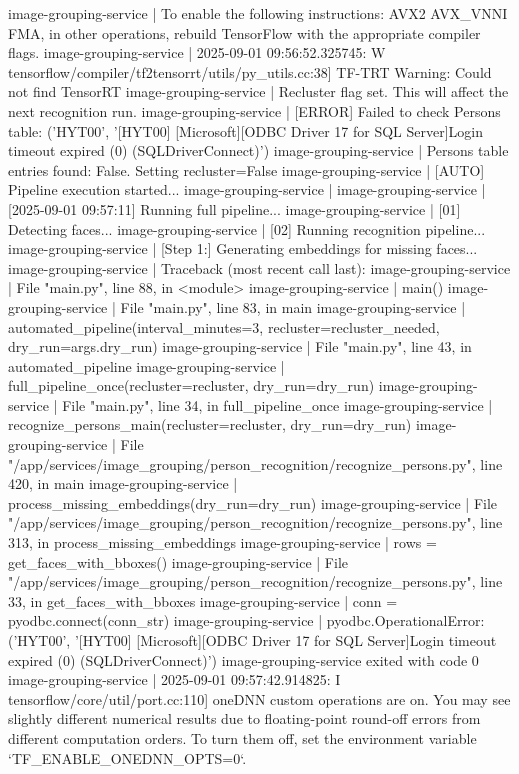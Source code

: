 image-grouping-service  | To enable the following instructions: AVX2 AVX_VNNI FMA, in other operations, rebuild TensorFlow with the appropriate compiler flags.
image-grouping-service  | 2025-09-01 09:56:52.325745: W tensorflow/compiler/tf2tensorrt/utils/py_utils.cc:38] TF-TRT Warning: Could not find TensorRT
image-grouping-service  | Recluster flag set. This will affect the next recognition run.
image-grouping-service  | [ERROR] Failed to check Persons table: ('HYT00', '[HYT00] [Microsoft][ODBC Driver 17 for SQL Server]Login timeout expired (0) (SQLDriverConnect)')
image-grouping-service  | Persons table entries found: False. Setting recluster=False
image-grouping-service  | [AUTO] Pipeline execution started...
image-grouping-service  |
image-grouping-service  | [2025-09-01 09:57:11] Running full pipeline...
image-grouping-service  | [01] Detecting faces...
image-grouping-service  | [02] Running recognition pipeline...
image-grouping-service  | [Step 1:] Generating embeddings for missing faces...
image-grouping-service  | Traceback (most recent call last):
image-grouping-service  |   File "main.py", line 88, in <module>
image-grouping-service  |     main()
image-grouping-service  |   File "main.py", line 83, in main
image-grouping-service  |     automated_pipeline(interval_minutes=3, recluster=recluster_needed, dry_run=args.dry_run)
image-grouping-service  |   File "main.py", line 43, in automated_pipeline
image-grouping-service  |     full_pipeline_once(recluster=recluster, dry_run=dry_run)
image-grouping-service  |   File "main.py", line 34, in full_pipeline_once
image-grouping-service  |     recognize_persons_main(recluster=recluster, dry_run=dry_run)
image-grouping-service  |   File "/app/services/image_grouping/person_recognition/recognize_persons.py", line 420, in main
image-grouping-service  |     process_missing_embeddings(dry_run=dry_run)
image-grouping-service  |   File "/app/services/image_grouping/person_recognition/recognize_persons.py", line 313, in process_missing_embeddings
image-grouping-service  |     rows = get_faces_with_bboxes()
image-grouping-service  |   File "/app/services/image_grouping/person_recognition/recognize_persons.py", line 33, in get_faces_with_bboxes
image-grouping-service  |     conn = pyodbc.connect(conn_str)
image-grouping-service  | pyodbc.OperationalError: ('HYT00', '[HYT00] [Microsoft][ODBC Driver 17 for SQL Server]Login timeout expired (0) (SQLDriverConnect)')
image-grouping-service exited with code 0
image-grouping-service  | 2025-09-01 09:57:42.914825: I tensorflow/core/util/port.cc:110] oneDNN custom operations are on. You may see slightly different numerical results due to floating-point round-off errors from different computation orders. To turn them off, set the environment variable `TF_ENABLE_ONEDNN_OPTS=0`.
